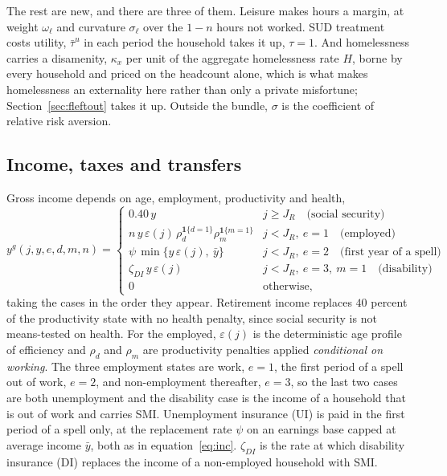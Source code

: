 \documentclass[10pt]{article}
\begin{document}
The rest are new, and there are three of them. Leisure makes hours a margin,
at weight $\omega_{\ell}$ and curvature $\sigma_{\ell}$ over the $1-n$ hours
not worked. SUD treatment costs utility, $\bar\tau^{u}$ in each
period the household takes it up, $\tau=1$. And homelessness carries a
disamenity, $\kappa_x$ per unit of the aggregate homelessness rate $H$, borne by
every household and priced on the headcount alone, which is what makes
homelessness an externality here rather than only a private misfortune;
Section~\ref{sec:fleftout} takes it up. Outside the bundle, $\sigma$ is the
coefficient of relative risk aversion.

\subsection{Income, taxes and transfers}\label{sec:ftaxes}

Gross income depends on age, employment, productivity and health,
\begin{equation}\label{eq:fincome}
y^{g}(j,y,e,d,m,n)=
\begin{cases}
0.40\,y & j\ge J_{R} \quad\text{(social security)}\\[2pt]
n\,y\,\varepsilon(j)\,\rho_{d}^{\mathbf{1}\{d=1\}}\rho_{m}^{\mathbf{1}\{m=1\}}
 & j<J_{R},\ e=1 \quad\text{(employed)}\\[2pt]
\psi\,\min\{y\,\varepsilon(j),\ \bar y\}
 & j<J_{R},\ e=2 \quad\text{(first year of a spell)}\\[2pt]
\zeta_{DI}\,y\,\varepsilon(j) & j<J_{R},\ e=3,\ m=1 \quad\text{(disability)}\\[2pt]
0 & \text{otherwise,}
\end{cases}
\end{equation}
taking the cases in the order they appear. Retirement income replaces $40$
percent of the productivity state with no health penalty, since social security
is not means-tested on health. For the employed, $\varepsilon(j)$ is
the deterministic age profile of efficiency and $\rho_d$ and
$\rho_m$ are productivity penalties applied \emph{conditional on working}.
The three employment states are work, $e=1$, the first period of a spell
out of work, $e=2$, and non-employment thereafter, $e=3$, so the last two cases
are both unemployment and the disability case is the income of a household that
is out of work and carries SMI. Unemployment insurance (UI) is paid in the first period of a spell only, at
the replacement rate $\psi$ on an earnings base capped at average income
$\bar y$, both as in equation~\eqref{eq:inc}. $\zeta_{DI}$ is the rate at which disability
insurance (DI) replaces the income of a non-employed household with SMI.
\end{document}

